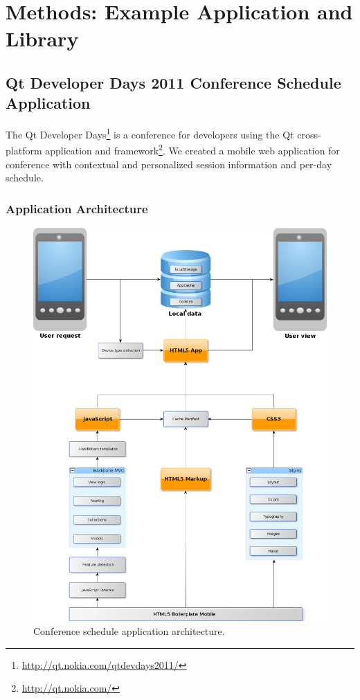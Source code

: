 \chapter{Methods: Example Application and Library}
\label{chapter:methods}

\section{Qt Developer Days 2011 Conference Schedule Application}
\label{section:devdays}

The Qt Developer
Days\footnote{\url{http://qt.nokia.com/qtdevdays2011/}} is a
conference for developers using the Qt cross-platform application and
 framework\footnote{\url{http://qt.nokia.com/}}. We created a
mobile web application for conference with contextual and personalized
session information and per-day schedule.

\subsection{Application Architecture}

\begin{figure}[ht]
  \begin{center}
    \includegraphics[width=\textwidth]{images/devdays.png}
    \caption{Conference schedule application architecture.}
    \label{figure:devdays.png}
  \end{center}
\end{figure}

